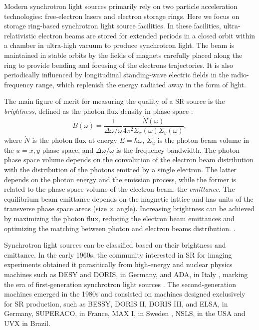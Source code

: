 Modern synchrotron light sources primarily rely on two particle acceleration technologies: free-electron lasers and electron storage rings. Here we focus on storage ring-based synchrotron light source facilities. In these facilities, ultra-relativistic electron beams are stored for extended periods in a closed orbit within a chamber in ultra-high vacuum to produce synchrotron light. The beam is maintained in stable orbits by the fields of magnets carefully placed along the ring to provide bending and focusing of the electrons trajectories. It is also periodically influenced by longitudinal standing-wave electric fields in the radio-frequency range, which replenish the energy radiated away in the form of light.

The main figure of merit for measuring the quality of a SR source is the \textit{brightness}\cite{huang_brightness_2013}, defined as the photon flux density in phase space \cite{hettel_challenges_2014,wiedemann_particle_2015}:
\begin{equation}
    B(\omega) = \frac{1}{\Delta \omega/\omega}\frac{\dot{N}(\omega)}{4\pi^2\Sigma_{x}(\omega)\Sigma_{y}(\omega)},
\end{equation}
where $\dot{N}$ is the photon flux at energy $E=\hbar\omega$, $\Sigma_{u}$ is the photon beam volume in the $u=x,y$ phase space, and $\Delta\omega/\omega$ is the frequency bandwidth. The photon phase space volume depends on the convolution of the electron beam distribution with the distribution of the photons emitted by a single electron. The latter depends on the photon energy and the emission process, while the former is related to the phase space volume of the electron beam: the \textit{emittance}. The equilibrium beam emittance depends on the magnetic lattice and has units of the transverse phase space areas (size $\times$ angle). Increasing brightness can be achieved by maximizing the photon flux, reducing the electron beam emittances and optimizing the matching between photon and electron beams distribution. \cite{wiedemann_particle_2015}.

Synchrotron light sources can be classified based on their brightness and emittance. In the early 1960s, the community interested in SR for imaging experiments obtained it parasitically from high-energy and nuclear physics machines such as DESY and DORIS, in Germany, and ADA, in Italy \cite{simoulin_synchrotron_2016}, marking the era of first-generation synchrotron light sources \cite{liu_towards_2017}. The second-generation machines emerged in the 1980s and consisted on machines designed exclusively for SR production, such as BESSY, DORIS II, DORIS III,  and ELSA, in Germany, SUPERACO, in France, MAX I, in Sweden \cite{simoulin_synchrotron_2016}, NSLS, in the USA and UVX in Brazil.


